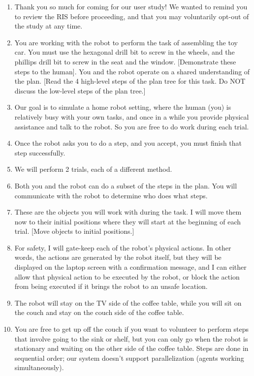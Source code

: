 \begin{enumerate}
    \item Thank you so much for coming for our user study! We wanted to remind you to review the RIS before proceeding, and that you may voluntarily opt-out of the study at any time.
    \item You are working with the robot to perform the task of assembling the toy car. You must use the hexagonal drill bit to screw in the wheels, and the phillips drill bit to screw in the seat and the window. [Demonstrate these steps to the human]. You and the robot operate on a shared understanding of the plan. [Read the 4 high-level steps of the plan tree for this task. Do NOT discuss the low-level steps of the plan tree.]
    \item Our goal is to simulate a home robot setting, where the human (you) is relatively busy with your own tasks, and once in a while you provide physical assistance and talk to the robot. So you are free to do work during each trial.
    \item Once the robot asks you to do a step, and you accept, you must finish that step successfully.
    \item We will perform 2 trials, each of a different method.
    \item Both you and the robot can do a subset of the steps in the plan. You will communicate with the robot to determine who does what steps.
    \item These are the objects you will work with during the task. I will move them now to their initial positions where they will start at the beginning of each trial. [Move objects to initial positions.]
    \item For safety, I will gate-keep each of the robot’s physical actions. In other words, the actions are generated by the robot itself, but they will be displayed on the laptop screen with a confirmation message, and I can either allow that physical action to be executed by the robot, or block the action from being executed if it brings the robot to an unsafe location.
    \item The robot will stay on the TV side of the coffee table, while you will sit on the couch and stay on the couch side of the coffee table.
    \item You are free to get up off the couch if you want to volunteer to perform steps that involve going to the sink or shelf, but you can only go when the robot is stationary and waiting on the other side of the coffee table. Steps are done in sequential order; our system doesn’t support parallelization (agents working simultaneously).

\end{enumerate}
